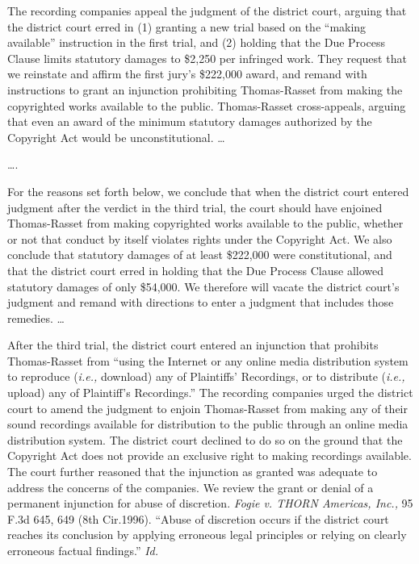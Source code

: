The recording companies appeal the judgment of the district court, arguing that
the district court erred in (1) granting a new trial based on the ``making
available'' instruction in the first trial, and (2) holding that the Due
Process Clause limits statutory damages to \$2,250 per infringed work. They
request that we reinstate and affirm the first jury's \$222,000 award, and
remand with instructions to grant an injunction prohibiting Thomas-Rasset from
making the copyrighted works available to the public. Thomas-Rasset
cross-appeals, arguing that even an award of the minimum statutory damages
authorized by the Copyright Act would be unconstitutional. {\dots}


\ldots.

For the reasons set forth below, we conclude that when the district court
entered judgment after the verdict in the third trial, the court should have
enjoined Thomas-Rasset from making copyrighted works available to the public,
whether or not that conduct by itself violates rights under the Copyright Act.
We also conclude that statutory damages of at least \$222,000 were
constitutional, and that the district court erred in holding that the Due
Process Clause allowed statutory damages of only \$54,000. We therefore will
vacate the district court's judgment and remand with directions to enter a
judgment that includes those remedies. {\dots}


After the third trial, the district court entered an injunction that prohibits
Thomas-Rasset from ``using the Internet or any online media distribution system
to reproduce (\textit{i.e.,} download) any of Plaintiffs' Recordings, or to
distribute (\textit{i.e.,} upload) any of Plaintiff's Recordings.'' The
recording companies urged the district court to amend the judgment to enjoin
Thomas-Rasset from making any of their sound recordings available for
distribution to the public through an online media distribution system. The
district court declined to do so on the ground that the Copyright Act does not
provide an exclusive right to making recordings available. The court further
reasoned that the injunction as granted was adequate to address the concerns of
the companies. We review the grant or denial of a permanent injunction for
abuse of discretion. \textit{Fogie v. THORN Americas, Inc.,} 95 F.3d 645, 649
(8th Cir.1996). ``Abuse of discretion occurs if the district court reaches its
conclusion by applying erroneous legal principles or relying on clearly
erroneous factual findings.'' \textit{Id.}

